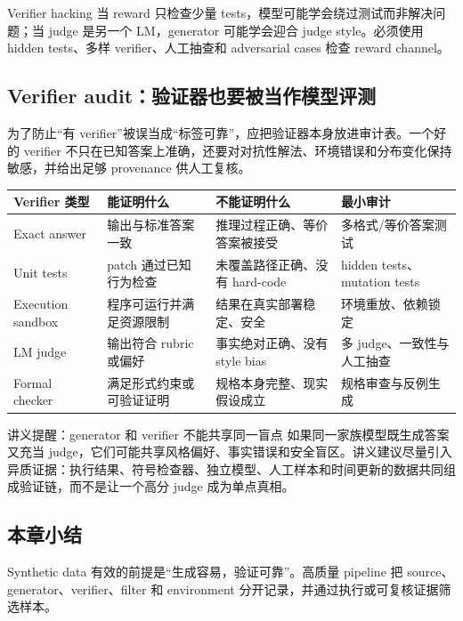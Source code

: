 \begin{warningbox}{Verifier hacking}
当 reward 只检查少量 tests，模型可能学会绕过测试而非解决问题；当 judge 是另一个 LM，generator 可能学会迎合 judge style。必须使用 hidden tests、多样 verifier、人工抽查和 adversarial cases 检查 reward channel。
\end{warningbox}

\subsection{Verifier audit：验证器也要被当作模型评测}

为了防止“有 verifier”被误当成“标签可靠”，应把验证器本身放进审计表。一个好的 verifier 不只在已知答案上准确，还要对对抗性解法、环境错误和分布变化保持敏感，并给出足够 provenance 供人工复核。

\begin{longtable}{L{0.19\textwidth}L{0.24\textwidth}L{0.24\textwidth}L{0.20\textwidth}}
\toprule
Verifier 类型 & 能证明什么 & 不能证明什么 & 最小审计 \\
\midrule
Exact answer & 输出与标准答案一致 & 推理过程正确、等价答案被接受 & 多格式/等价答案测试 \\
Unit tests & patch 通过已知行为检查 & 未覆盖路径正确、没有 hard-code & hidden tests、mutation tests \\
Execution sandbox & 程序可运行并满足资源限制 & 结果在真实部署稳定、安全 & 环境重放、依赖锁定 \\
LM judge & 输出符合 rubric 或偏好 & 事实绝对正确、没有 style bias & 多 judge、一致性与人工抽查 \\
Formal checker & 满足形式约束或可验证证明 & 规格本身完整、现实假设成立 & 规格审查与反例生成 \\
\bottomrule
\end{longtable}

\begin{knowledgebox}{讲义提醒：generator 和 verifier 不能共享同一盲点}
如果同一家族模型既生成答案又充当 judge，它们可能共享风格偏好、事实错误和安全盲区。讲义建议尽量引入异质证据：执行结果、符号检查器、独立模型、人工样本和时间更新的数据共同组成验证链，而不是让一个高分 judge 成为单点真相。
\end{knowledgebox}


\subsection{本章小结}

Synthetic data 有效的前提是“生成容易，验证可靠”。高质量 pipeline 把 source、generator、verifier、filter 和 environment 分开记录，并通过执行或可复核证据筛选样本。


